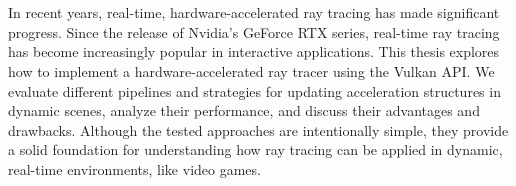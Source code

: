 \chapter{\abstractname}

In recent years, real-time, hardware-accelerated ray tracing has made significant progress. Since the release of Nvidia's GeForce RTX series, real-time ray tracing has become increasingly popular in interactive applications. This thesis explores how to implement a hardware-accelerated ray tracer using the Vulkan API. We evaluate different pipelines and strategies for updating acceleration structures in dynamic scenes, analyze their performance, and discuss their advantages and drawbacks. Although the tested approaches are intentionally simple, they provide a solid foundation for understanding how ray tracing can be applied in dynamic, real-time environments, like video games.